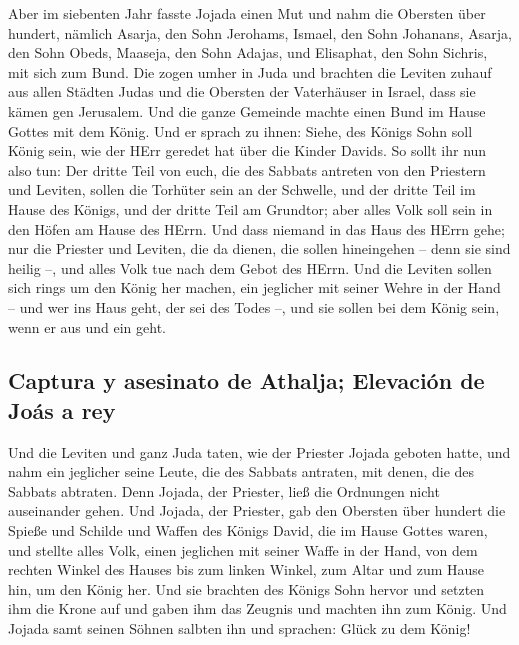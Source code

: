  Aber im siebenten Jahr fasste Jojada einen Mut und nahm
die Obersten über hundert, nämlich Asarja, den Sohn Jerohams, Ismael,
den Sohn Johanans, Asarja, den Sohn Obeds, Maaseja, den Sohn Adajas, und
Elisaphat, den Sohn Sichris, mit sich zum Bund.  Die zogen
umher in Juda und brachten die Leviten zuhauf aus allen Städten Judas
und die Obersten der Vaterhäuser in Israel, dass sie kämen gen
Jerusalem.  Und die ganze Gemeinde machte einen Bund im
Hause Gottes mit dem König. Und er sprach zu ihnen: Siehe, des Königs
Sohn soll König sein, wie der HErr geredet hat über die Kinder Davids.
 So sollt ihr nun also tun: Der dritte Teil von euch, die
des Sabbats antreten von den Priestern und Leviten, sollen die Torhüter
sein an der Schwelle,  und der dritte Teil im Hause des
Königs, und der dritte Teil am Grundtor; aber alles Volk soll sein in
den Höfen am Hause des HErrn.  Und dass niemand in das
Haus des HErrn gehe; nur die Priester und Leviten, die da dienen, die
sollen hineingehen -- denn sie sind heilig --, und alles Volk tue nach
dem Gebot des HErrn.  Und die Leviten sollen sich rings um
den König her machen, ein jeglicher mit seiner Wehre in der Hand -- und
wer ins Haus geht, der sei des Todes --, und sie sollen bei dem König
sein, wenn er aus und ein geht.

\hypertarget{captura-y-asesinato-de-athalja-elevaciuxf3n-de-jouxe1s-a-rey}{%
\subsection{Captura y asesinato de Athalja; Elevación de Joás a
rey}\label{captura-y-asesinato-de-athalja-elevaciuxf3n-de-jouxe1s-a-rey}}

 Und die Leviten und ganz Juda taten, wie der Priester
Jojada geboten hatte, und nahm ein jeglicher seine Leute, die des
Sabbats antraten, mit denen, die des Sabbats abtraten. Denn Jojada, der
Priester, ließ die Ordnungen nicht auseinander gehen.  Und
Jojada, der Priester, gab den Obersten über hundert die Spieße und
Schilde und Waffen des Königs David, die im Hause Gottes waren,
 und stellte alles Volk, einen jeglichen mit seiner Waffe
in der Hand, von dem rechten Winkel des Hauses bis zum linken Winkel,
zum Altar und zum Hause hin, um den König her.  Und sie
brachten des Königs Sohn hervor und setzten ihm die Krone auf und gaben
ihm das Zeugnis und machten ihn zum König. Und Jojada samt seinen Söhnen
salbten ihn und sprachen: Glück zu dem König!

